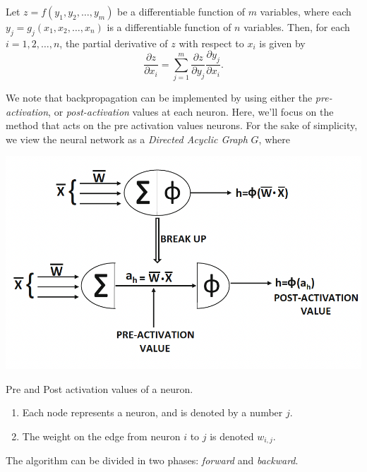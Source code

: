\documentclass[nobib]{tufte-handout} %
\begin{document}
\begin{theorem} \label{chain}
    Let $z = f(y_1, y_2, \ldots, y_m)$ be a differentiable function of $m$ variables, where each $y_j = g_j(x_1, x_2, \ldots, x_n)$ is a differentiable function of $n$ variables. Then, for each $i = 1, 2, \ldots, n$, the partial derivative of $z$ with respect to $x_i$ is given by
$$
\frac{\partial z}{\partial x_i} = \sum_{j=1}^{m} \frac{\partial z}{\partial y_j} \frac{\partial y_j}{\partial x_i}.$$
  \end{theorem}
  We note that backpropagation can be implemented by using either the \textit{pre-activation}, or \textit{post-activation} values at each neuron. Here, we'll focus on the method that acts on the pre activation values neurons. For the sake of simplicity, we view the neural network as a \textit{Directed Acyclic Graph} $G$, where 
  \begin{marginfigure}
    \includegraphics{pre-post-neuron}  
    \caption{Pre and Post activation values of a neuron.}
  \end{marginfigure}
  \begin{enumerate}
    \item Each node represents a neuron, and is denoted by a number $j$.
    \item The weight on the edge from neuron $i$ to $j$ is denoted $w_{i,j}$.
  \end{enumerate}
  The algorithm can be divided in two phases: \textit{forward} and \textit{backward}.
\end{document}
